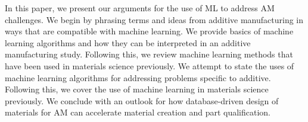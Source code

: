 In this paper, we present our arguments for the use of ML to address AM challenges. We begin by phrasing terms and ideas from additive manufacturing in ways that are compatible with machine learning. We provide basics of machine learning algorithms and how they can be interpreted in an additive manufacturing study. Following this, we review machine learning methods that have been used in materials science previously. We attempt to state the uses of machine learning algorithms for addressing problems specific to additive. Following this, we cover the use of machine learning in materials science previously. We conclude with an outlook for how database-driven design of materials for AM can accelerate material creation and part qualification.

